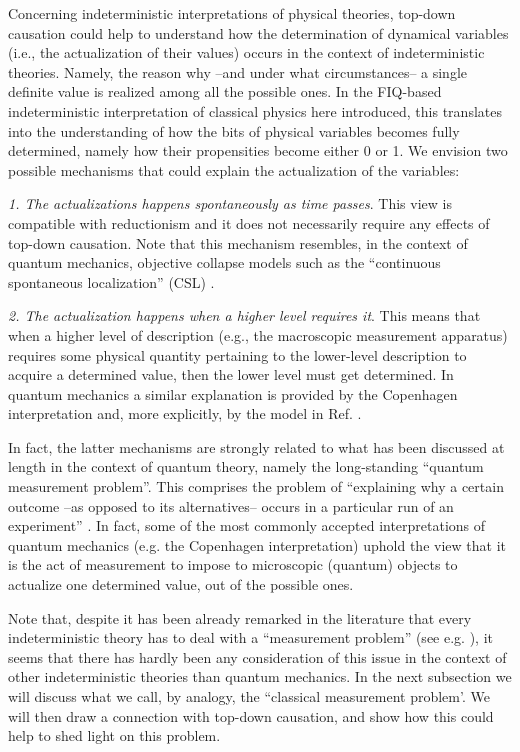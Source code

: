 \documentclass[12pt]{article}
\begin{document}
Concerning indeterministic interpretations of physical theories, top-down causation could help to understand how the determination of dynamical variables (i.e., the actualization of their values) occurs in the context of indeterministic theories. Namely, the reason why --and under what circumstances-- a single definite value is realized among all the possible ones. In the FIQ-based indeterministic interpretation of classical physics here introduced, this translates into the understanding of how the bits of physical variables becomes fully determined, namely how their propensities become either 0 or 1. We envision two possible mechanisms that could explain the actualization of the variables:

\textit{1. The actualizations happens spontaneously as time passes}. This view is compatible with reductionism and it does not necessarily require any effects of top-down causation. Note that this mechanism resembles, in the context of quantum mechanics, objective collapse models such as the ``continuous spontaneous localization'' (CSL) \cite{gisincollapse, cls}. 

\textit{2. The actualization happens when a higher level requires it}. This means that when a higher level of description (e.g., the macroscopic measurement apparatus) requires some physical quantity pertaining to the lower-level description to acquire a determined value, then the lower level must get determined. In quantum mechanics a similar explanation is provided by the Copenhagen interpretation and, more explicitly, by the model in Ref. \cite{topdown2}.

In fact, the latter mechanisms are strongly related to what has been discussed at length in the context of quantum theory, namely the long-standing ``quantum measurement problem''. This comprises the problem of ``explaining why a certain outcome --as opposed to its alternatives-- occurs in a particular run of an experiment'' \cite{brukner}. In fact, some of the most commonly accepted interpretations of quantum mechanics (e.g. the Copenhagen interpretation) uphold the view that it is the act of measurement to impose to microscopic (quantum) objects to actualize one determined value, out of the possible ones.

Note that, despite it has been already remarked in the literature that every indeterministic theory has to deal with a ``measurement problem'' (see e.g. \cite{brukner}), it seems that there has hardly been any consideration of this issue in the context of other indeterministic theories than quantum mechanics. In the next subsection we will discuss what we call, by analogy, the ``classical measurement problem'. We will then draw a connection with top-down causation, and show how this could help to shed light on this problem.
\end{document}
